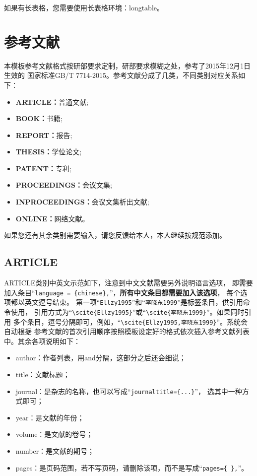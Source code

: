 如果有长表格，您需要使用长表格环境：longtable。

\section{参考文献}
本模板参考文献格式按研部要求定制，研部要求模糊之处，参考了2015年12月1日生效的%
国家标准GB/T 7714-2015。参考文献分成了几类，不同类别对应关系如下：%
\begin{itemize}
\itemsep=0pt \parskip=0pt
  \item \textbf{ARTICLE：}普通文献;
  \item \textbf{BOOK：}书籍;
  \item \textbf{REPORT：}报告;
  \item \textbf{THESIS：}学位论文;
  \item \textbf{PATENT：}专利;
  \item \textbf{PROCEEDINGS：}会议文集;
  \item \textbf{INPROCEEDINGS：}会议文集析出文献;
  \item \textbf{ONLINE：}网络文献。
\end{itemize}
如果您还有其余类别需要输入，请您反馈给本人，本人继续按规范添加。

\subsection{ARTICLE}
ARTICLE类别中英文示范如下，注意到中文文献需要另外说明语言选项，%
即需要加入条目“\verb"language = {chinese},"”，\textbf{所有中文条目都需要加入该选项}，%
每个选项都以英文逗号结束。%
第一项“\verb"Ellzy1995"”和“\verb"李晓东1999"”是标签条目，供引用命令使用，%
引用方式为“\verb"\scite{Ellzy1995}"”或“\verb"\scite{李晓东1999}"”。如果同时引用%
多个条目，逗号分隔即可，例如，“\verb"\scite{Ellzy1995,李晓东1999}"”。系统会自动根据%
参考文献的首次引用顺序按照模板设定好的格式依次插入参考文献列表中。其余各项说明如下：%
\begin{itemize}
\itemsep=0pt \parskip=0pt
  \item author：作者列表，用and分隔，这部分之后还会细说；
  \item title：文献标题；%
  \item journal：是杂志的名称，也可以写成“\verb"journaltitle={...}"”，%
    选其中一种方式即可；
  \item year：是文献的年份；
  \item volume：是文献的卷号；
  \item number：是文献的期号；%
  \item pages：是页码范围，若不写页码，请删除该项，而不是写成“\verb"pages={ },"”。
\end{itemize}

